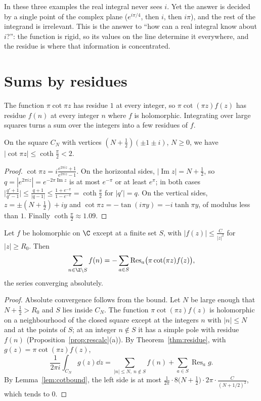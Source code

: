 \begin{beauty}
In these three examples the real integral never sees $i$. Yet the answer is decided by a single point of the complex plane
($e^{i\pi/4}$, then $i$, then $i\pi$), and the rest of the integrand is irrelevant. This is the answer to ``how can a real
integral know about $i$?'': the function is rigid, so its values on the line determine it everywhere, and the residue is
where that information is concentrated.
\end{beauty}

\section{Sums by residues}

The function $\pi\cot\pi z$ has residue $1$ at every integer, so $\pi\cot(\pi z)f(z)$ has residue $f(n)$ at every integer $n$ where $f$ is
holomorphic. Integrating over large squares turns a sum over the integers into a few residues of $f$.

\begin{lemma}\label{lem:cotbound}
On the square $C_N$ with vertices $(N+\frac12)(\pm1\pm i)$, $N\ge0$, we have $|\cot\pi z|\le\coth\frac\pi2<2$.
\end{lemma}
\begin{proof}
$\cot\pi z=i\frac{e^{2\pi iz}+1}{e^{2\pi iz}-1}$. On the horizontal sides, $|\operatorname{Im}z|=N+\frac12$, so $q=|e^{2\pi iz}|=e^{-2\pi\operatorname{Im}z}$ is at most $e^{-\pi}$ or at least $e^\pi$; in both cases
$\bigl|\frac{q'+1}{q'-1}\bigr|\le\frac{q+1}{|q-1|}\le\frac{1+e^{-\pi}}{1-e^{-\pi}}=\coth\frac\pi2$ for $|q'|=q$. On the vertical sides, $z=\pm(N+\frac12)+iy$ and $\cot\pi z=-\tan(i\pi y)=-i\tanh\pi y$,
of modulus less than $1$. Finally $\coth\frac\pi2\approx1.09$.
\end{proof}

\begin{theorem}\label{thm:residuesum}
Let $f$ be holomorphic on $\C$ except at a finite set $S$, with $|f(z)|\le\frac C{|z|^2}$ for $|z|\ge R_0$. Then
\[
\sum_{n\in\Z\setminus S}f(n)=-\sum_{a\in S}\operatorname{Res}_a\bigl(\pi\cot(\pi z)f(z)\bigr),
\]
the series converging absolutely.
\end{theorem}
\begin{proof}
Absolute convergence follows from the bound. Let $N$ be large enough that $N+\frac12>R_0$ and $S$ lies inside $C_N$. The function
$\pi\cot(\pi z)f(z)$ is holomorphic on a neighbourhood of the closed square except at the integers $n$ with $|n|\le N$ and at the points of
$S$; at an integer $n\notin S$ it has a simple pole with residue $f(n)$ (Proposition~\ref{prop:rescalc}(a)). By Theorem~\ref{thm:residue}, with
$g(z)=\pi\cot(\pi z)f(z)$,
\[
\frac1{2\pi i}\int_{C_N}g(z)\dd z=\sum_{|n|\le N,\ n\notin S}f(n)+\sum_{a\in S}\operatorname{Res}_ag.
\]
By Lemma~\ref{lem:cotbound}, the left side is at most $\frac1{2\pi}\cdot8\bigl(N+\frac12\bigr)\cdot2\pi\cdot\frac C{(N+1/2)^2}$, which tends to $0$.
\end{proof}

